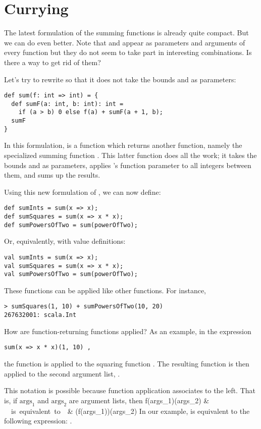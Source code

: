 \section{Currying}

The latest formulation of the summing functions is already quite
compact. But we can do even better. Note that
 and  appear as parameters and arguments of every function
but they do not seem to take part in interesting combinations. Is
there a way to get rid of them?

Let's try to rewrite  so that it does not take the bounds
 and  as parameters:
\begin{lstlisting}
def sum(f: int => int) = {
  def sumF(a: int, b: int): int = 
    if (a > b) 0 else f(a) + sumF(a + 1, b);
  sumF
}
\end{lstlisting}
In this formulation,  is a function which returns another
function, namely the specialized summing function . This
latter function does all the work; it takes the bounds  and
 as parameters, applies 's function parameter  to all
integers between them, and sums up the results. 

Using this new formulation of , we can now define:
\begin{lstlisting}
def sumInts = sum(x => x);
def sumSquares = sum(x => x * x);
def sumPowersOfTwo = sum(powerOfTwo);
\end{lstlisting}
Or, equivalently, with value definitions:
\begin{lstlisting}
val sumInts = sum(x => x);
val sumSquares = sum(x => x * x);
val sumPowersOfTwo = sum(powerOfTwo);
\end{lstlisting}
These functions can be applied like other functions. For instance,
\begin{lstlisting}
> sumSquares(1, 10) + sumPowersOfTwo(10, 20)
267632001: scala.Int
\end{lstlisting}
How are function-returning functions applied? As an example, in the expression
\begin{lstlisting}
sum(x => x * x)(1, 10) ,
\end{lstlisting}
the function  is applied to the squaring function 
. The resulting function is then 
applied to the second argument list, .

This notation is possible because function application associates to the left.
That is, if $\mbox{args}_1$ and $\mbox{args}_2$ are argument lists, then 
f(\mbox{args}_1)(\mbox{args}_2) & \ \ \mbox{is equivalent to}\ \ & (f(\mbox{args}_1))(\mbox{args}_2)
\eda
In our example,  is equivalent to the
following expression:
.


